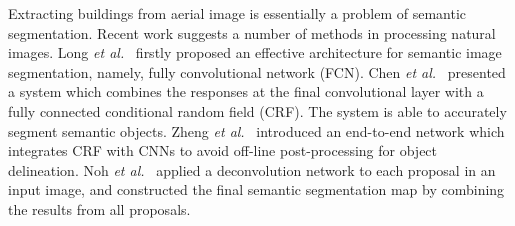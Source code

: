 Extracting buildings from aerial image is essentially a problem of semantic segmentation. Recent work suggests a number of methods in processing natural images. Long \textit{et al.}~\cite{Long2014Fully} firstly proposed an effective architecture for semantic image segmentation, namely, fully convolutional network (FCN).
Chen \textit{et al.}~\cite{chen14semantic} presented a system which combines the responses at the final convolutional layer with a fully connected conditional random field (CRF). The system is able to accurately segment semantic objects. Zheng \textit{et al.}~\cite{Zheng2015Conditional} introduced an end-to-end network  which integrates CRF with CNNs to avoid off-line post-processing  for object delineation. Noh \textit{et al.}~\cite{Noh2015Learning} applied a deconvolution network to each proposal in an input image, and constructed the final semantic segmentation map by combining the results from all proposals.


